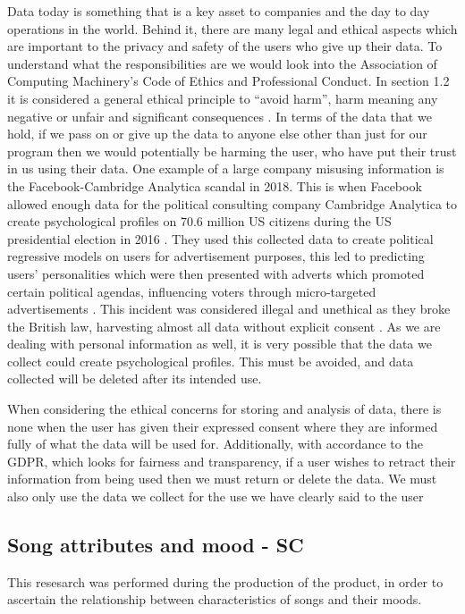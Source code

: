 \documentclass[10pt, notitlepage]{report}
\begin{document}
Data today is something that is a key asset to companies and the day to day operations in the world. Behind it, there are many legal and ethical aspects which are important to the privacy and safety of the users who give up their data. To understand what the responsibilities are we would look into the Association of Computing Machinery’s Code of Ethics and Professional Conduct. In section 1.2 it is considered a general ethical principle to “avoid harm”, harm meaning any negative or unfair and significant consequences \cite{ComputingMachineryACM2018}. In terms of the data that we hold, if we pass on or give up the data to anyone else other than just for our program then we would potentially be harming the user, who have put their trust in us using their data. One example of a large company misusing information is the Facebook-Cambridge Analytica scandal in 2018. This is when Facebook allowed enough data for the political consulting company Cambridge Analytica to create psychological profiles on 70.6 million US citizens during the US presidential election in 2016 \cite{Horwitz2018}. They used this collected data to create political regressive models on users for advertisement purposes, this led to predicting users’ personalities which were then presented with adverts which promoted certain political agendas, influencing voters through micro-targeted advertisements \cite{Rathi2019}. This incident was considered illegal and unethical as they broke the British law, harvesting almost all data without explicit consent \cite{ASNC2018}. As we are dealing with personal information as well, it is very possible that the data we collect could create psychological profiles. This must be avoided, and data collected will be deleted after its intended use.

When considering the ethical concerns for storing and analysis of data, there is none when the user has given their expressed consent where they are informed fully of what the data will be used for. Additionally, with accordance to the GDPR, which looks for fairness and transparency, if a user wishes to retract their information from being used then we must return or delete the data. We must also only use the data we collect for the use we have clearly said to the user


\subsection{Song attributes and mood - SC}
\label{res:mood}

This resesarch was performed during the production of the product, in order to ascertain the relationship between characteristics of songs and their moods.\newline
\end{document}
